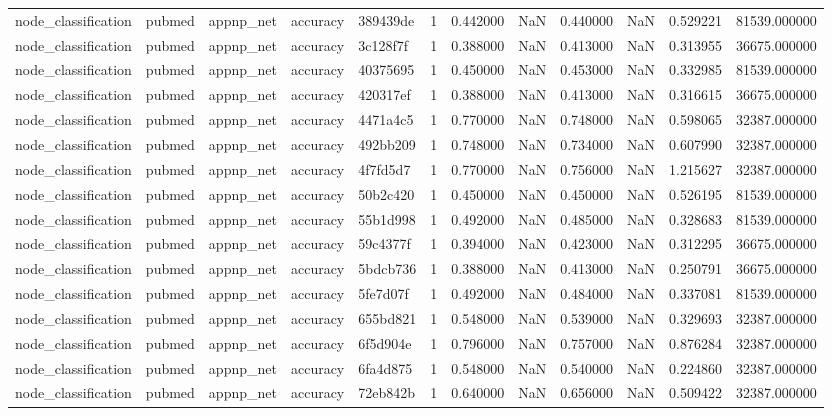 \begin{tabular}{lllllrrrrrrr}
node_classification & pubmed & appnp_net & accuracy & 389439de & 1 & 0.442000 & NaN & 0.440000 & NaN & 0.529221 & 81539.000000 \\
node_classification & pubmed & appnp_net & accuracy & 3c128f7f & 1 & 0.388000 & NaN & 0.413000 & NaN & 0.313955 & 36675.000000 \\
node_classification & pubmed & appnp_net & accuracy & 40375695 & 1 & 0.450000 & NaN & 0.453000 & NaN & 0.332985 & 81539.000000 \\
node_classification & pubmed & appnp_net & accuracy & 420317ef & 1 & 0.388000 & NaN & 0.413000 & NaN & 0.316615 & 36675.000000 \\
node_classification & pubmed & appnp_net & accuracy & 4471a4c5 & 1 & 0.770000 & NaN & 0.748000 & NaN & 0.598065 & 32387.000000 \\
node_classification & pubmed & appnp_net & accuracy & 492bb209 & 1 & 0.748000 & NaN & 0.734000 & NaN & 0.607990 & 32387.000000 \\
node_classification & pubmed & appnp_net & accuracy & 4f7fd5d7 & 1 & 0.770000 & NaN & 0.756000 & NaN & 1.215627 & 32387.000000 \\
node_classification & pubmed & appnp_net & accuracy & 50b2c420 & 1 & 0.450000 & NaN & 0.450000 & NaN & 0.526195 & 81539.000000 \\
node_classification & pubmed & appnp_net & accuracy & 55b1d998 & 1 & 0.492000 & NaN & 0.485000 & NaN & 0.328683 & 81539.000000 \\
node_classification & pubmed & appnp_net & accuracy & 59c4377f & 1 & 0.394000 & NaN & 0.423000 & NaN & 0.312295 & 36675.000000 \\
node_classification & pubmed & appnp_net & accuracy & 5bdcb736 & 1 & 0.388000 & NaN & 0.413000 & NaN & 0.250791 & 36675.000000 \\
node_classification & pubmed & appnp_net & accuracy & 5fe7d07f & 1 & 0.492000 & NaN & 0.484000 & NaN & 0.337081 & 81539.000000 \\
node_classification & pubmed & appnp_net & accuracy & 655bd821 & 1 & 0.548000 & NaN & 0.539000 & NaN & 0.329693 & 32387.000000 \\
node_classification & pubmed & appnp_net & accuracy & 6f5d904e & 1 & 0.796000 & NaN & 0.757000 & NaN & 0.876284 & 32387.000000 \\
node_classification & pubmed & appnp_net & accuracy & 6fa4d875 & 1 & 0.548000 & NaN & 0.540000 & NaN & 0.224860 & 32387.000000 \\
node_classification & pubmed & appnp_net & accuracy & 72eb842b & 1 & 0.640000 & NaN & 0.656000 & NaN & 0.509422 & 32387.000000 \\

\end{tabular}
